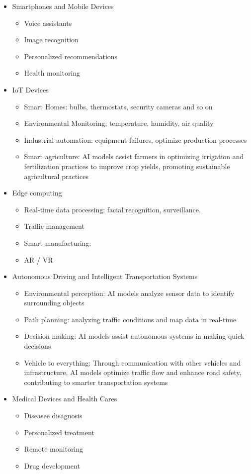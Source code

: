 \begin{itemize}
	\item Smartphones and Mobile Devices
		\begin{itemize}
			\item Voice assistants
			\item Image recognition
			\item Personalized recommendations
			\item Health monitoring
		\end{itemize}
	\item IoT Devices
		\begin{itemize}
			\item Smart Homes: bulbs, thermostats, security cameras and so on
			\item Environmental Monitoring: temperature, humidity, air quality
			\item Industrial automation: equipment failures, optimize
				production processes
			\item Smart agriculture: AI models assist farmers in optimizing
				irrigation and fertilization practices to improve crop yields,
				promoting sustainable agricultural practices
		\end{itemize}
	\item Edge computing
		\begin{itemize}
			\item Real-time data processing: facial recognition, surveillance. 
			\item Traffic management
			\item Smart manufacturing: 
			\item AR / VR
		\end{itemize}
	\item Autonomous Driving and Intelligent Transportation Systems
		\begin{itemize}
			\item Environmental perception: AI models analyze sensor data to
				identify surrounding objects
			\item Path planning: analyzing traffic conditions and map data in
				real-time 
			\item Decision making: AI models assist autonomous systems in
				making quick decisions 
			\item Vehicle to everything: Through communication with other
				vehicles and infrastructure, AI models optimize traffic flow
				and enhance road safety, contributing to smarter transportation
				systems
		\end{itemize}
	\item Medical Devices and Health Cares
		\begin{itemize}
			\item Diseasee disagnosis
			\item Personalized treatment
			\item Remote monitoring
			\item Drug development
		\end{itemize}
\end{itemize}

